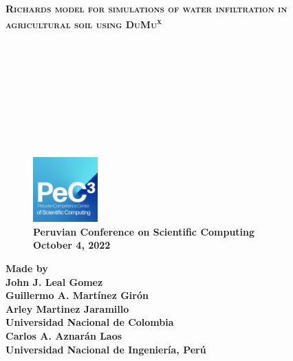 {
\begin{frame}

	\color{c++reviewduneblue}

	\begin{flushleft}\bfseries\scshape\huge
		Richards model for simulations of water infiltration in
		agricultural soil using DuMu\textsuperscript{x}
	\end{flushleft}

	\

	\

	\

	\

	\

	\begin{minipage}{0.47\textwidth}
		\begin{figure}[ht!]
			\centering
			\includegraphics[height=2.5cm]{pec3}
			\captionsetup{justification=centering,margin=.2cm}
			\caption*{
				\large
				\bfseries
				\textcolor{c++reviewduneblue}{
					Peruvian Conference on Scientific Computing \\
					October 4, 2022}
			}
		\end{figure}
	\end{minipage}
	\begin{minipage}{0.5\textwidth}
		\begin{flushright}
			\large
			\bfseries
			Made by\\
			John J. Leal Gomez\\
			Guillermo A. Martínez Girón\\
			Arley Martinez Jaramillo\\
			Universidad Nacional de Colombia\\
			Carlos A. Aznarán Laos\\
			Universidad Nacional de Ingeniería, Perú
		\end{flushright}
	\end{minipage}
\end{frame}
}